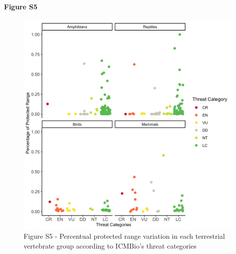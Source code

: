 \documentclass[12pt,openright,oneside,a4paper,english]{abntex2}
\begin{document}
\subsubsection*{Figure S5}\label{fig:fig1-s5}
\begin{figure}[H]
	\centering
	\includegraphics[width=160mm]{Fig c1-s5}
	\caption*{\small Figure S5 - Percentual protected range variation in each terrestrial vertebrate group according to ICMBio’s threat categories}
\end{figure}



\chapter[Cerrado endemic tetrapod bioregions]{}\label{chap2}
\end{document}
